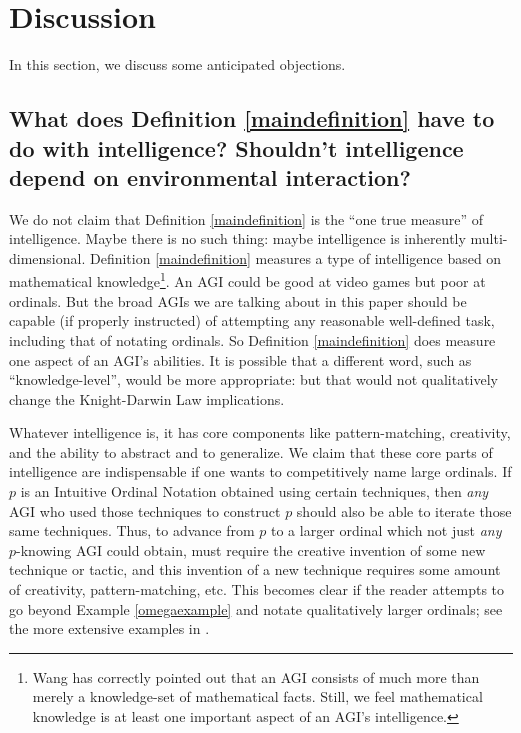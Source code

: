 \documentclass[runningheads]{llncs}
\begin{document}
\section{Discussion}
\label{objectionsection}

In this section, we discuss some anticipated objections.

\subsection{What does Definition \ref{maindefinition} have to do with intelligence?
Shouldn't intelligence depend on environmental interaction?}

We do not claim that Definition \ref{maindefinition} is the ``one true measure'' of
intelligence. Maybe there is no such thing: maybe intelligence is inherently
multi-dimensional. Definition \ref{maindefinition} measures a type of
intelligence based on mathematical knowledge\footnote{Wang has
correctly pointed out \cite{wang2007} that an AGI consists of much more than merely
a knowledge-set of mathematical facts. Still, we feel mathematical knowledge is at least
one important aspect of an AGI's intelligence.}. An AGI could be good at video games
but poor at ordinals. But the broad AGIs we are talking about in this paper
should be capable (if properly
instructed) of attempting any reasonable well-defined task, including that of
notating ordinals. So Definition \ref{maindefinition} does
measure one aspect of an AGI's abilities. It is possible that
a different word, such as
``knowledge-level'', would be more appropriate: but
that would not qualitatively change
the Knight-Darwin Law implications.

Whatever intelligence is, it has core components like pattern-matching,
creativity, and the ability to abstract and to generalize.
We claim that these core parts of intelligence are indispensable if one wants to
competitively name large ordinals. If $p$ is an Intuitive Ordinal Notation
obtained using certain techniques, then \emph{any} AGI who used those
techniques to construct $p$ should also be able to iterate those same techniques.
Thus, to advance from
$p$ to a larger ordinal which not just \emph{any} $p$-knowing
AGI could obtain, must require
the creative invention of some new technique or tactic, and
this invention of a new technique requires some amount of creativity,
pattern-matching, etc. This becomes clear if the reader attempts to
go beyond Example \ref{omegaexample} and notate qualitatively larger ordinals;
see the more extensive examples in \cite{github}.
\end{document}
